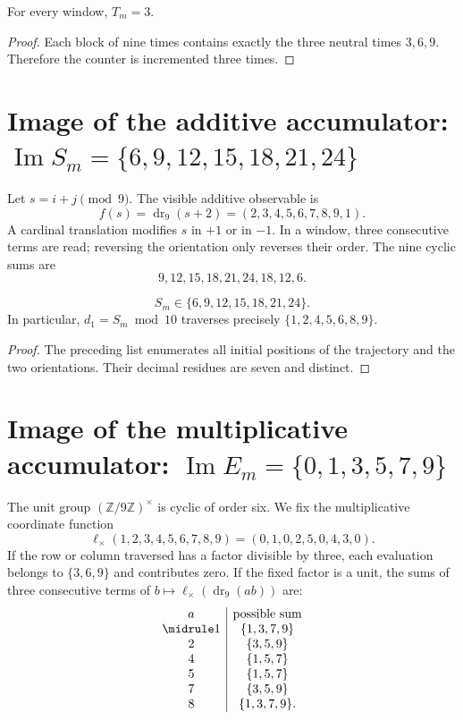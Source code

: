 \begin{lemma}
For every window, \(T_m=3\).
\end{lemma}
\begin{proof}
Each block of nine times contains exactly the three neutral times
\(3,6,9\). Therefore the counter is incremented three times.
\end{proof}

\section{Image of the additive accumulator: \(\operatorname{Im}S_m=\{6,9,12,15,18,21,24\}\)}

Let \(s=i+j\pmod9\). The visible additive observable is
\[
f(s)=\operatorname{dr}_9(s+2)=(2,3,4,5,6,7,8,9,1).
\]
A cardinal translation modifies \(s\) in \(+1\) or in \(-1\). In a window,
three consecutive terms are read; reversing the orientation only reverses their
order. The nine cyclic sums are
\[
9,12,15,18,21,24,18,12,6.
\]

\begin{lemma}
\[
S_m\in\{6,9,12,15,18,21,24\}.
\]
In particular, \(d_1=S_m\bmod10\) traverses precisely
\(\{1,2,4,5,6,8,9\}\).
\end{lemma}
\nopagebreak[4]
\begin{proof}
The preceding list enumerates all initial positions of the trajectory and the
two orientations. Their decimal residues are seven and distinct.\qedhere
\end{proof}

\section{Image of the multiplicative accumulator: \(\operatorname{Im}E_m=\{0,1,3,5,7,9\}\)}

The unit group \((\mathbb Z/9\mathbb Z)^\times\) is cyclic of order
six. We fix the multiplicative coordinate function
\[
\ell_\times(1,2,3,4,5,6,7,8,9)=(0,1,0,2,5,0,4,3,0).
\]
If the row or column traversed has a factor divisible by three, each
evaluation belongs to \(\{3,6,9\}\) and contributes zero. If the fixed factor is a
unit, the sums of three consecutive terms of
\(b\mapsto\ell_\times(\operatorname{dr}_9(ab))\) are:
\[
\begin{array}{c|c}
a&\text{possible sum}\\
\midrule
1&\{1,3,7,9\}\\
2&\{3,5,9\}\\
4&\{1,5,7\}\\
5&\{1,5,7\}\\
7&\{3,5,9\}\\
8&\{1,3,7,9\}.
\end{array}
\]

